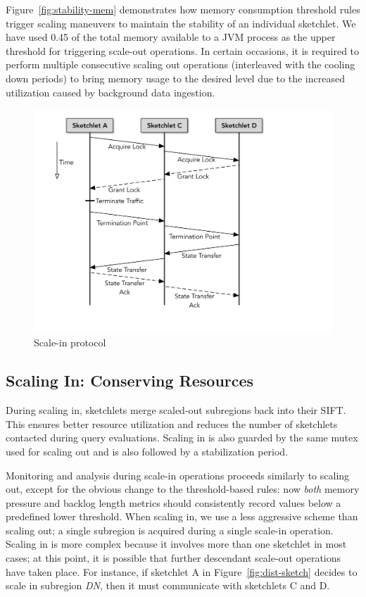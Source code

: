 \documentclass[9pt,journal,compsoc]{IEEEtran}
\begin{document}
Figure~\ref{fig:stability-mem} demonstrates how memory consumption threshold rules trigger scaling maneuvers to maintain the stability of an individual sketchlet.
We have used 0.45 of the total memory available to a JVM process as the upper threshold for triggering scale-out operations.
In certain occasions, it is required to perform multiple consecutive scaling out operations (interleaved with the cooling down periods) to bring memory usage to the desired level due to the increased utilization caused by background data ingestion. \vspace{-1em}

%
%
\begin{figure}[b!]
    \centering
    \includegraphics[scale=0.4, valign=t]{figures/scale-in.pdf} 
    \caption{Scale-in protocol}
    \label{fig:scale-in-protocol}
\end{figure}
\subsection{Scaling In: Conserving Resources}
\label{subsec:scaling-in}
During scaling in, sketchlets merge scaled-out subregions back into their SIFT.
This ensures better resource utilization and reduces the number of sketchlets contacted during query evaluations.
Scaling in is also guarded by the same mutex used for scaling out and is also followed by a stabilization period.

Monitoring and analysis during scale-in operations proceeds similarly to scaling out, except for the obvious change to the threshold-based rules: now \textit{both} memory pressure and backlog length metrics should consistently record values below a predefined lower threshold.
When scaling in, we use a less aggressive scheme than scaling out; a single subregion is acquired during a single scale-in operation.
Scaling in is more complex because it involves more than one sketchlet in most cases; 
at this point, it is possible that further descendant scale-out operations have taken place.
For instance, if sketchlet A in Figure~\ref{fig:dist-sketch} decides to scale in subregion \emph{DN}, then it must communicate with sketchlets C and D.
\end{document}
